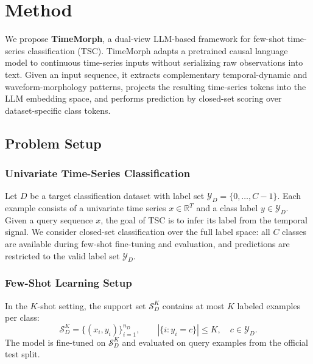\documentclass[10pt,journal,compsoc]{IEEEtran}
\begin{document}
\section{Method}
\label{sec:method}

We propose \textbf{TimeMorph}, a dual-view LLM-based framework for few-shot time-series classification (TSC).
TimeMorph adapts a pretrained causal language model to continuous time-series inputs without serializing raw observations into text.
Given an input sequence, it extracts complementary temporal-dynamic and waveform-morphology patterns, projects the resulting time-series tokens into the LLM embedding space, and performs prediction by closed-set scoring over dataset-specific class tokens.

\subsection{Problem Setup}
\label{sec:problem-formulation}

\subsubsection{Univariate Time-Series Classification}
Let $D$ be a target classification dataset with label set
$\mathcal{Y}_D=\{0,\ldots,C-1\}$.
Each example consists of a univariate time series $x\in\mathbb{R}^{T}$ and a class label $y\in\mathcal{Y}_D$.
Given a query sequence $x$, the goal of TSC is to infer its label from the temporal signal.
We consider closed-set classification over the full label space: all $C$ classes are available during few-shot fine-tuning and evaluation, and predictions are restricted to the valid label set $\mathcal{Y}_D$.

\subsubsection{Few-Shot Learning Setup}
In the $K$-shot setting, the support set
$\mathcal{S}_D^{K}$ contains at most $K$ labeled examples per class:
\begin{equation}
\label{eq:k-shot-support}
\mathcal{S}_D^{K}
=
\{(x_i,y_i)\}_{i=1}^{n_D},
\qquad
|\{i:y_i=c\}|\le K,\quad c\in\mathcal{Y}_D .
\end{equation}
The model is fine-tuned on $\mathcal{S}_D^{K}$ and evaluated on query examples from the official test split.
\end{document}
